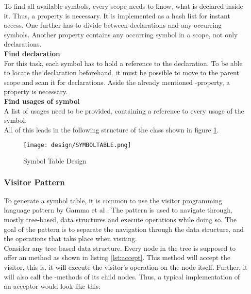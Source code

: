 To find all available symbols, every scope needs to know, what is declared inside it.
Thus, a property  is necessary.
It is implemented as a hash list for instant access.
One further has to divide between declarations and any occurring symbols.
Another property  contains any occurring symbol in a scope, not only declarations.\\

\textbf{Find declaration}\\
For this task, each symbol has to hold a reference to the declaration.
To be able to locate the declaration beforehand, it must be possible to move to the parent scope and scan it for declarations.
Aside the already mentioned -property, a   property is necessary. \\

\textbf{Find usages of symbol}\\
A list of usages need to be provided, containing a reference to every usage of the symbol. \\

All of this leads in the following structure of the class  shown in figure \ref{fig:symboltabledesign}.

\begin{figure}[H]
    \centering
    \texttt{[image: design/SYMBOLTABLE.png]}
    \caption{Symbol Table Design}
    \label{fig:symboltabledesign}
\end{figure}

\subsubsection{Visitor Pattern}
To generate a symbol table, it is common to use the visitor programming language pattern by Gamma et al \cite{gofBook}. 
The pattern is used to navigate through, mostly tree-based, data structures and execute operations while doing so.
The goal of the pattern is to separate the navigation through the data structure, and the operations that take place when visiting.\\

Consider any tree based data structure.
Every node in the tree is supposed to offer an  method as shown in listing \ref{lst:accept}.
This method will accept the visitor, this is, it will execute the visitor's operation on the node itself.
Further, it will also call the -methods of its child nodes.
Thus, a typical implementation of an acceptor would look like this:

